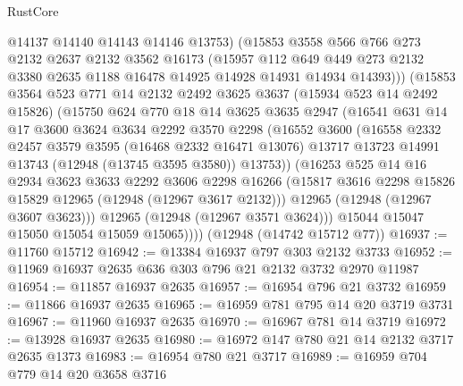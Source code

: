 \begin{lexlean}{RustCore}
\begin{coremodule}
            @14137
            @14140
            @14143
            @14146
            @13753)
          (@15853
            @3558
            @566
            @766
            @273
            @2132
            @2637
            @2132
            @3562
            @16173
            (@15957
              @112
              @649
              @449
              @273
              @2132
              @3380
              @2635
              @1188
              @16478
              @14925
              @14928
              @14931
              @14934
              @14393)))
        (@15853
          @3564
          @523
          @771
          @14
          @2132
          @2492
          @3625
          @3637
          (@15934 @523 @14 @2492 @15826)
          (@15750
            @624
            @770
            @18
            @14
            @3625
            @3635
            @2947
            (@16541
              @631
              @14
              @17
              @3600
              @3624
              @3634
              @2292
              @3570
              @2298
              (@16552
                @3600
                (@16558
                  @2332
                  @2457
                  @3579
                  @3595
                  (@16468 @2332 @16471 @13076)
                  @13717
                  @13723
                  @14991
                  @13743
                  (@12948 (@13745 @3595 @3580))
                  @13753))
              (@16253
                @525
                @14
                @16
                @2934
                @3623
                @3633
                @2292
                @3606
                @2298
                @16266
                (@15817 @3616 @2298 @15826 @15829 @12965 (@12948 (@12967 @3617 @2132)))
                @12965
                (@12948 (@12967 @3607 @3623)))
              @12965
              (@12948 (@12967 @3571 @3624)))
            @15044
            @15047
            @15050
            @15054
            @15059
            @15065))))
    (@12948 (@14742 @15712 @77))
@16937 := @11760 @15712
@16942 := @13384 @16937 @797 @303 @2132 @3733
@16952 := @11969 @16937 @2635 @636 @303 @796 @21 @2132 @3732 @2970 @11987
@16954 := @11857 @16937 @2635
@16957 := @16954 @796 @21 @3732
@16959 := @11866 @16937 @2635
@16965 := @16959 @781 @795 @14 @20 @3719 @3731
@16967 := @11960 @16937 @2635
@16970 := @16967 @781 @14 @3719
@16972 := @13928 @16937 @2635
@16980 := @16972 @147 @780 @21 @14 @2132 @3717 @2635 @1373
@16983 := @16954 @780 @21 @3717
@16989 := @16959 @704 @779 @14 @20 @3658 @3716

\end{coremodule}
\end{lexlean}
